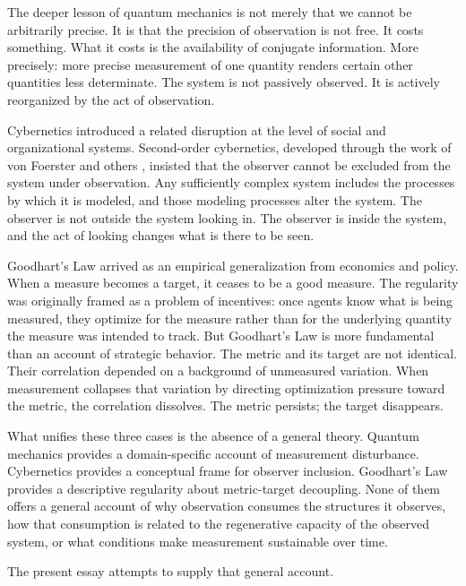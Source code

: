 \documentclass[12pt, a4paper]{article}
\theoremstyle{flyxion}
\begin{document}
The deeper lesson of quantum mechanics is not merely that we cannot be arbitrarily precise. It is that the precision of observation is not free. It costs something. What it costs is the availability of conjugate information. More precisely: more precise measurement of one quantity renders certain other quantities less determinate. The system is not passively observed. It is actively reorganized by the act of observation.

Cybernetics introduced a related disruption at the level of social and organizational systems. Second-order cybernetics, developed through the work of von Foerster and others \cite{foerster2003,ashby1956}, insisted that the observer cannot be excluded from the system under observation. Any sufficiently complex system includes the processes by which it is modeled, and those modeling processes alter the system. The observer is not outside the system looking in. The observer is inside the system, and the act of looking changes what is there to be seen.

Goodhart's Law \cite{goodhart1975,campbell1976} arrived as an empirical generalization from economics and policy. When a measure becomes a target, it ceases to be a good measure. The regularity was originally framed as a problem of incentives: once agents know what is being measured, they optimize for the measure rather than for the underlying quantity the measure was intended to track. But Goodhart's Law is more fundamental than an account of strategic behavior. The metric and its target are not identical. Their correlation depended on a background of unmeasured variation. When measurement collapses that variation by directing optimization pressure toward the metric, the correlation dissolves. The metric persists; the target disappears.

What unifies these three cases is the absence of a general theory. Quantum mechanics provides a domain-specific account of measurement disturbance. Cybernetics provides a conceptual frame for observer inclusion. Goodhart's Law provides a descriptive regularity about metric-target decoupling. None of them offers a general account of why observation consumes the structures it observes, how that consumption is related to the regenerative capacity of the observed system, or what conditions make measurement sustainable over time.

The present essay attempts to supply that general account.

\end{document}
